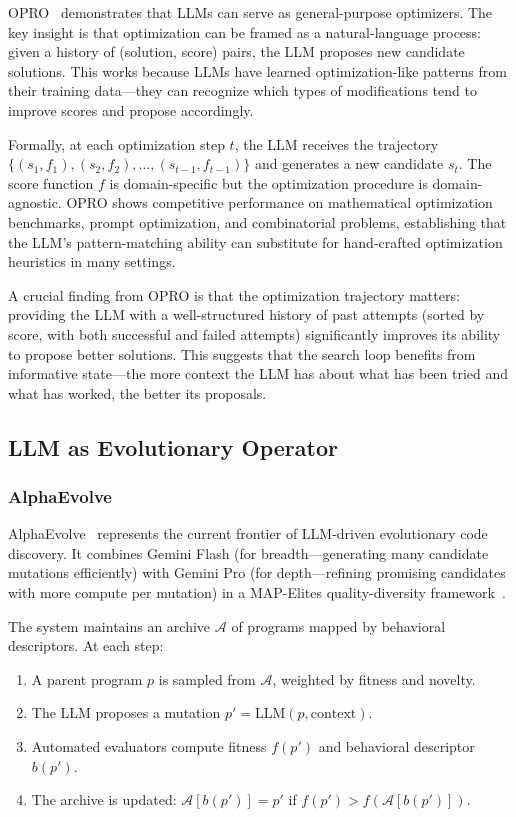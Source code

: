 \documentclass[11pt,a4paper]{article}
\begin{document}
OPRO~\citep{yang2023opro} demonstrates that LLMs can serve as general-purpose optimizers. The key insight is that optimization can be framed as a natural-language process: given a history of (solution, score) pairs, the LLM proposes new candidate solutions. This works because LLMs have learned optimization-like patterns from their training data---they can recognize which types of modifications tend to improve scores and propose accordingly.

Formally, at each optimization step $t$, the LLM receives the trajectory $\{(s_1, f_1), (s_2, f_2), \ldots, (s_{t-1}, f_{t-1})\}$ and generates a new candidate $s_t$. The score function $f$ is domain-specific but the optimization procedure is domain-agnostic. OPRO shows competitive performance on mathematical optimization benchmarks, prompt optimization, and combinatorial problems, establishing that the LLM's pattern-matching ability can substitute for hand-crafted optimization heuristics in many settings.

A crucial finding from OPRO is that the optimization trajectory matters: providing the LLM with a well-structured history of past attempts (sorted by score, with both successful and failed attempts) significantly improves its ability to propose better solutions. This suggests that the search loop benefits from informative state---the more context the LLM has about what has been tried and what has worked, the better its proposals.

\subsection{LLM as Evolutionary Operator}

\subsubsection{AlphaEvolve}

AlphaEvolve~\citep{novikov2025alphaevolve} represents the current frontier of LLM-driven evolutionary code discovery. It combines Gemini Flash (for breadth---generating many candidate mutations efficiently) with Gemini Pro (for depth---refining promising candidates with more compute per mutation) in a MAP-Elites quality-diversity framework~\citep{mouret2015mapelites}.

The system maintains an archive $\mathcal{A}$ of programs mapped by behavioral descriptors. At each step:
\begin{enumerate}
\item A parent program $p$ is sampled from $\mathcal{A}$, weighted by fitness and novelty.
\item The LLM proposes a mutation $p' = \text{LLM}(p, \text{context})$.
\item Automated evaluators compute fitness $f(p')$ and behavioral descriptor $b(p')$.
\item The archive is updated: $\mathcal{A}[b(p')] = p'$ if $f(p') > f(\mathcal{A}[b(p')])$.
\end{enumerate}
\end{document}
